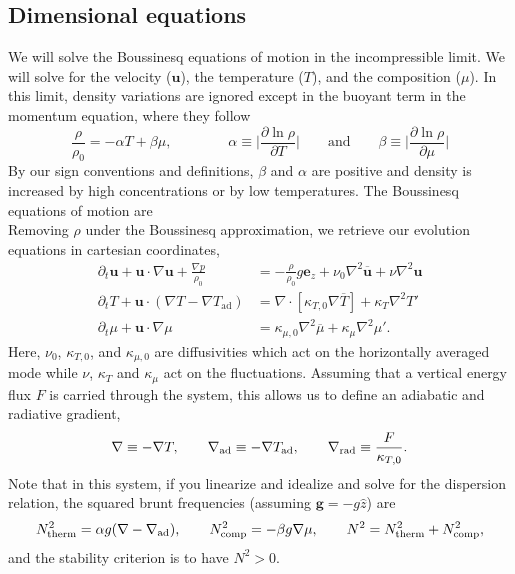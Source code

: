 \documentclass[onecolumn, amsmath, amsfonts, amssymb]{aastex62}
\newcommand{\grad}{\ensuremath{\nabla}}
\renewcommand{\bar}[1]{\ensuremath{\overline{#1}}}
\renewcommand{\vec}[1]{\ensuremath{\mathbf{#1}}}
\renewcommand{\dot}{\ensuremath{\cdot}}
\begin{document}
\subsection{Dimensional equations}
We will solve the Boussinesq equations of motion in the incompressible limit.
We will solve for the velocity (\vec{u}), the temperature ($T$), and the composition ($\mu$).
In this limit, density variations are ignored except in the buoyant term in the momentum equation, where they follow
\begin{equation}
\frac{\rho}{\rho_0} = -\alpha T + \beta \mu,\qquad\qquad
\alpha \equiv \bigg|\frac{\partial\ln\rho}{\partial T}\bigg| \qquad\mathrm{and}\qquad
\beta  \equiv \bigg|\frac{\partial\ln\rho}{\partial \mu}\bigg|
\end{equation}
By our sign conventions and definitions, $\beta$ and $\alpha$ are positive and density is increased by high concentrations or by low temperatures.
The Boussinesq equations of motion are
\begin{equation}
\end{equation}
Removing $\rho$ under the Boussinesq approximation, we retrieve our evolution equations in cartesian coordinates,
\begin{align}
    \partial_t \vec{u} + \vec{u}\dot\grad\vec{u} + \frac{\grad p}{\rho_0} &= -\frac{\rho}{\rho_0}g\vec{e}_z + \nu_0\grad^2\bar{\vec{u}}  + \nu \grad^2\vec{u}\\
    \partial_t T + \vec{u}\dot(\grad T - \grad T_{\mathrm{ad}}) &= \grad\dot[\kappa_{T,0} \grad \bar{T}] + \kappa_T \grad^2 T' \label{eqn:temperature_eqn} \\
    \partial_t \mu + \vec{u}\dot\grad \mu &= \kappa_{\mu,0} \grad^2 \bar{\mu} + \kappa_{\mu} \grad^2 \mu' .
\end{align}
Here, $\nu_0$, $\kappa_{T,0}$, and $\kappa_{\mu,0}$ are diffusivities which act on the horizontally averaged mode while $\nu$, $\kappa_T$ and $\kappa_\mu$ act on the fluctuations.
Assuming that a vertical energy flux $F$ is carried through the system, this allows us to define an adiabatic and radiative gradient,
\begin{equation}
    \grad \equiv - \grad T, \qquad
    \grad_{\rm{ad}} \equiv - \grad T_{\rm{ad}}, \qquad
    \grad_{\rm{rad}} \equiv \frac{F}{\kappa_{T,0}}.
\end{equation}
Note that in this system, if you linearize and idealize and solve for the dispersion relation, the squared brunt frequencies (assuming $\vec{g} = - g \hat{z}$) are
\begin{equation}
    N_{\mathrm{therm}}^2 = \alpha g (\grad - \grad_{\rm{ad}}), \qquad
    N_{\mathrm{comp}}^2 =  -\beta  g \grad \mu, \qquad
    N^2 = N_{\mathrm{therm}}^2 + N_{\mathrm{comp}}^2,
\end{equation}
and the stability criterion is to have $N^2 > 0$.
\end{document}
